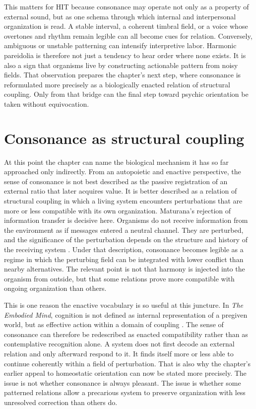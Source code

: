 This matters for HIT because consonance may operate not only as a property of external sound, but as one schema through which internal and interpersonal organization is read. A stable interval, a coherent timbral field, or a voice whose overtones and rhythm remain legible can all become cues for relation. Conversely, ambiguous or unstable patterning can intensify interpretive labor. Harmonic pareidolia is therefore not just a tendency to hear order where none exists. It is also a sign that organisms live by constructing actionable pattern from noisy fields. That observation prepares the chapter's next step, where consonance is reformulated more precisely as a biologically enacted relation of structural coupling. Only from that bridge can the final step toward psychic orientation be taken without equivocation.

\section{Consonance as structural coupling}

At this point the chapter can name the biological mechanism it has so far approached only indirectly. From an autopoietic and enactive perspective, the sense of consonance is not best described as the passive registration of an external ratio that later acquires value. It is better described as a relation of structural coupling in which a living system encounters perturbations that are more or less compatible with its own organization. Maturana's rejection of information transfer is decisive here. Organisms do not receive information from the environment as if messages entered a neutral channel. They are perturbed, and the significance of the perturbation depends on the structure and history of the receiving system \parencite{maturana_1970, maturana_varela_1980}. Under that description, consonance becomes legible as a regime in which the perturbing field can be integrated with lower conflict than nearby alternatives. The relevant point is not that harmony is injected into the organism from outside, but that some relations prove more compatible with ongoing organization than others.

This is one reason the enactive vocabulary is so useful at this juncture. In \emph{The Embodied Mind}, cognition is not defined as internal representation of a pregiven world, but as effective action within a domain of coupling \parencite{varela_thompson_rosch_1991}. The sense of consonance can therefore be redescribed as enacted compatibility rather than as contemplative recognition alone. A system does not first decode an external relation and only afterward respond to it. It finds itself more or less able to continue coherently within a field of perturbation. That is also why the chapter's earlier appeal to homeostatic orientation can now be stated more precisely. The issue is not whether consonance is always pleasant. The issue is whether some patterned relations allow a precarious system to preserve organization with less unresolved correction than others do.

